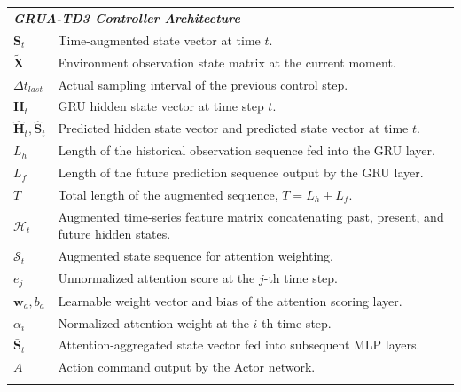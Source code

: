 \documentclass[review]{elsarticle}
\begin{document}
\begin{longtable}{@{}p{2.5cm} p{12.5cm}@{}}
\multicolumn{2}{l}{\textbf{\textit{GRUA-TD3 Controller Architecture}}} \\
$\mathbf{S}_t$ & Time-augmented state vector at time $t$. \\
$\tilde{\mathbf{X}}$ & Environment observation state matrix at the current moment. \\
$\Delta t_{last}$ & Actual sampling interval of the previous control step. \\
$\mathbf{H}_t$ & GRU hidden state vector at time step $t$. \\
$\hat{\mathbf{H}}_t, \hat{\mathbf{S}}_t$ & Predicted hidden state vector and predicted state vector at time $t$. \\
$L_h$ & Length of the historical observation sequence fed into the GRU layer. \\
$L_f$ & Length of the future prediction sequence output by the GRU layer. \\
$T$ & Total length of the augmented sequence, $T = L_h + L_f$. \\
$\mathcal{H}_t$ & Augmented time-series feature matrix concatenating past, present, and future hidden states. \\
$\mathcal{S}_t$ & Augmented state sequence for attention weighting. \\
$e_j$ & Unnormalized attention score at the $j$-th time step. \\
$\mathbf{w}_a, b_a$ & Learnable weight vector and bias of the attention scoring layer. \\
$\alpha_i$ & Normalized attention weight at the $i$-th time step. \\
$\bar{\mathbf{S}}_t$ & Attention-aggregated state vector fed into subsequent MLP layers. \\
$A$ & Action command output by the Actor network. \\
\\


\end{longtable}
\end{document}
